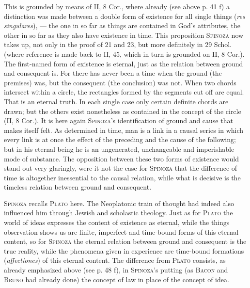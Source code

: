 \documentclass[12pt]{article}
\newcommand{\opage}[1]{\marginnote{\footnotesize\textit{[#1]}}}
\begin{document}
This is grounded by means of II, 8 Cor., where already (see above p. 41 f) a distinction was made
between a double form of existence for all single things (\textit{res singulares}), --- the one in so
far as things are contained in God's attributes, the other in so far as they also have existence in
time. This proposition \textsc{Spinoza} now takes up, not only in the proof of 21 and 23, but more
definitely in 29 Schol. (where reference is made back to II, 45, which in turn is grounded on II, 8
Cor.). The first-named form of existence is eternal, just as the relation between ground and
consequent is. For there has never been a time when the ground (the premises) was, but the
consequent (the conclusion) was not. When two chords \opage{90}intersect within a circle, the
rectangles formed by the segments cut off are equal. That is an eternal truth. In each single case
only certain definite chords are drawn; but the others exist nonetheless as contained in the
concept of the circle (II, 8 Cor.). It is here again \textsc{Spinoza}'s identification of ground and
cause that makes itself felt. As determined in time, man is a link in a causal series in which
every link is at once the effect of the preceding and the cause of the following; but in his
eternal being he is an ungenerated, unchangeable and imperishable mode of substance. The opposition
between these two forms of existence would stand out very glaringly, were it not the case for
\textsc{Spinoza} that the difference of time is altogether inessential to the causal relation, while
what is decisive is the timeless relation between ground and consequent.

\textsc{Spinoza} recalls \textsc{Plato} here. The Neoplatonic train of thought had indeed also
influenced him through Jewish and scholastic theology. Just as for \textsc{Plato} the world of
ideas expresses the content of existence as eternal, while the things observation shows us are
finite, imperfect and time-bound forms of this eternal content, so for \textsc{Spinoza} the eternal
relation between ground and consequent is the true reality, while the phenomena given in experience
are time-bound formations (\textit{affectiones}) of this eternal content. The difference from
\textsc{Plato} consists, as already emphasized above (see p. 48 f), in \textsc{Spinoza}'s putting
(as \textsc{Bacon} and \textsc{Bruno} had already done) the concept of law in place of the concept of
idea.
\end{document}
